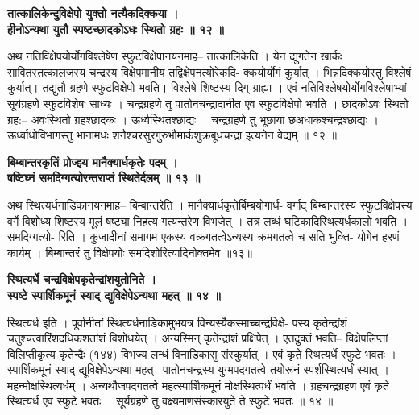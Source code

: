 \documentclass[11pt, openany]{book}
\begin{document}
{{{{\vspace{2mm}
\centering
\textbf{
 तात्कालिकेन्दुविक्षेपो युक्तो नत्यैकदिक्कया ।\\
 \hspace{2cm}
 हीनोऽन्यथा युतौ स्पष्टच्छादकोऽधः स्थितो ग्रहः ॥ १२ ॥}
 
\vspace{2mm}
\justifying
 अथ नतिविक्षेपयोर्योगविश्लेषेण स्फुटविक्षेपानयनमाह-- तात्कालिकेति
। येन
द्युगतेन खार्कः सावितस्तत्कालजस्य चन्द्रस्य विक्षेपमानीय
तद्विक्षेपनत्योरेकदि-
क्कयोर्योगं कुर्यात् । भिन्नदिक्कयोस्तु विश्लेषं कुर्यात्। तद्युतौ
ग्रहणे स्फुटविक्षेपो
भवति। विश्लेषे शिष्टस्य दिग् ग्राह्या । एवं
नतिविश्लेषयोर्योगविश्लेषाभ्यां
सूर्यग्रहणे स्फुटविशेषः साध्यः । चन्द्रग्रहणे तु पातोनचन्द्रादानीत एव
स्फुटविक्षेपो
भवति । छादकोऽवः स्थितो ग्रह:-- अवःस्थितो ग्रहश्छादकः ।
ऊर्ध्वस्थितश्छाद्यः ।
चन्द्रग्रहणे तु भूछाया छअधाकश्चन्द्रश्छाद्यः ।
ऊर्ध्वाधोविभागस्तु
भानामधः शनैश्चरसुरगुरुभौमार्कशुक्रबूधचन्द्रा इत्यनेन वेद्यम् ॥ १२ ॥

\newpage
\thispagestyle{fancy}
\fancyhf{}
\rhead{[ग्रहणाधिकारः]}
\centering
\textbf{
 बिम्बान्तरकृतिं प्रोज्झ्य मानैक्यार्धकृतेः पदम् ।\\
 \hspace{0.3cm}
 षष्टिघ्नं समदिग्गत्योरन्तराप्तं स्थितेर्दलम् ॥ १३ ॥}

\vspace{2mm}
\justifying
 अथ स्थित्यर्धनाडिकानयनमाह-- बिम्बान्तरेति ।
मानैक्यार्धकृतेर्बिम्बयोगार्ध-
वर्गाद् बिम्बान्तरस्य स्फुटविक्षेपस्य वर्गे विशोध्य शिष्टस्य मूलं
षष्ट्या निहत्य
गत्यन्तरेण विभजेत् । तत्र लब्धं घटिकादिस्थित्यर्धकालो भवति ।
समदिग्गत्यो-
रिति । कुजादीनां समागम एकस्य वक्रगतत्वेऽन्यस्य क्रमगतत्वे च सति
भुक्ति-
योगेन हरणं कार्यम् । बिम्बान्तरं तु विक्षेपयोः समदिशोरित्यादिनोक्तमेव
॥१३॥

\vspace{2mm}
\centering
\textbf{
\hspace{-1cm}
 स्थित्यर्धे चन्द्रविक्षेपकृतेन्द्रांशयुतोनिते ।\\
 \hspace{1.9cm}
 स्पष्टे स्पार्शिकमूनं स्याद् द्युविक्षेपेऽन्यथा महत् ॥ १४ ॥}

\vspace{2mm}
\justifying
 स्थित्यर्ध इति । पूर्वानीतां स्थित्यर्धनाडिकामुभयत्र
विन्यस्यैकस्माच्चन्द्रविक्षे-
पस्य कृतेन्द्रांशं चतुश्चत्वारिंशदधिकशतांशं विशोधयेत् । अन्यस्मिन्
कृतेन्द्रांशं
प्रक्षिपेत् । एतदुक्तं भवति-- विक्षेपलिप्तां विलिप्तीकृत्य
कृतेन्द्रैः (१४४) विभज्य
लन्धं विनाडिकासु संस्कुर्यात् । एवं कृते स्थित्यर्धे स्फुटे भवतः ।
स्पार्शिकमूनं
स्याद् द्यूविक्षेपेऽन्यथा महत्-- पातोनचन्द्रस्य युग्मपदगतत्वे
तयोरूनं स्पर्शस्थित्यर्धं
स्यात् । महन्मोक्षस्थित्यर्धम् । अन्यथौजपदगतत्वे महत्स्पार्शिकमूनं
मोक्षस्थित्पर्धं
भवति । ग्रहचन्द्रग्रहण एवं कृते स्थित्यर्ध एव स्फुटे भवतः ।
सूर्यग्रहणे तु
वक्ष्यमाणसंस्कारयुते ते स्फुटे भवतः ॥ १४ ॥

}}}}
\end{document}
